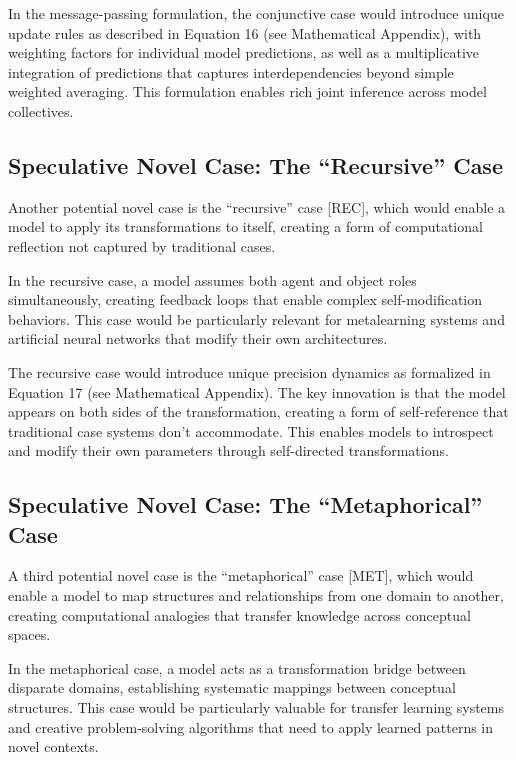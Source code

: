 In the message-passing formulation, the conjunctive case would introduce
unique update rules as described in Equation 16 (see Mathematical
Appendix), with weighting factors for individual model predictions, as
well as a multiplicative integration of predictions that captures
interdependencies beyond simple weighted averaging. This formulation
enables rich joint inference across model collectives.

\hypertarget{speculative-novel-case-the-recursive-case}{%
\subsection{Speculative Novel Case: The ``Recursive''
Case}\label{speculative-novel-case-the-recursive-case}}

Another potential novel case is the ``recursive'' case {[}REC{]}, which
would enable a model to apply its transformations to itself, creating a
form of computational reflection not captured by traditional cases.

In the recursive case, a model assumes both agent and object roles
simultaneously, creating feedback loops that enable complex
self-modification behaviors. This case would be particularly relevant
for metalearning systems and artificial neural networks that modify
their own architectures.

The recursive case would introduce unique precision dynamics as
formalized in Equation 17 (see Mathematical Appendix). The key
innovation is that the model appears on both sides of the
transformation, creating a form of self-reference that traditional case
systems don't accommodate. This enables models to introspect and modify
their own parameters through self-directed transformations.

\hypertarget{speculative-novel-case-the-metaphorical-case}{%
\subsection{Speculative Novel Case: The ``Metaphorical''
Case}\label{speculative-novel-case-the-metaphorical-case}}

A third potential novel case is the ``metaphorical'' case {[}MET{]},
which would enable a model to map structures and relationships from one
domain to another, creating computational analogies that transfer
knowledge across conceptual spaces.

In the metaphorical case, a model acts as a transformation bridge
between disparate domains, establishing systematic mappings between
conceptual structures. This case would be particularly valuable for
transfer learning systems and creative problem-solving algorithms that
need to apply learned patterns in novel contexts.

